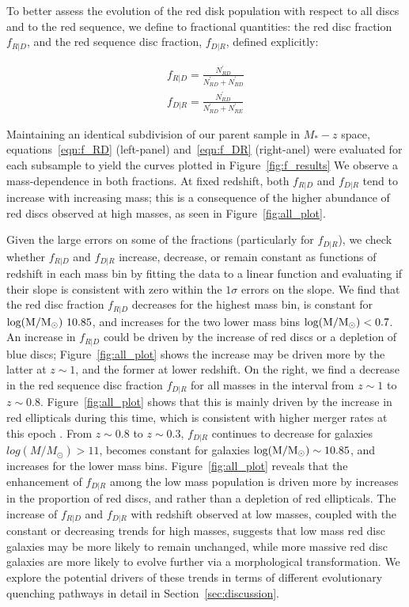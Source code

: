 \documentclass[useAMS,usenatbib]{mn2e}
\begin{document}
To better assess the evolution of the red disk population with respect to all discs and to the red sequence, we define to fractional quantities: the red disc fraction $f_{R|D}$, and the red sequence disc fraction, $f_{D|R}$, defined explicitly:

\begin{align}
f_{R|D} = \frac{N^{'}_{RD}}{N^{'}_{RD}+N^{'}_{BD}} \label{eqn:f_RD}\\
f_{D|R} = \frac{N^{'}_{RD}}{N^{'}_{RD}+N^{'}_{RE}}
\label{eqn:f_DR}
\end{align}


Maintaining an identical subdivision of our parent sample in $M_{*}-z$ space, equations~\ref{eqn:f_RD} (left-panel) and~\ref{eqn:f_DR} (right-anel) were evaluated for each subsample to yield the curves plotted in Figure~\ref{fig:f_results} We observe a mass-dependence in both fractions. At fixed redshift, both $f_{R|D}$ and $f_{D|R}$ tend to increase with increasing mass; this is a consequence of the higher abundance of red discs observed at high masses, as seen in Figure~\ref{fig:all_plot}. 

Given the large errors on some of the fractions (particularly for $f_{D|R}$), we check whether $f_{R|D}$ and $f_{D|R}$ increase, decrease, or remain constant as functions of redshift in each mass bin by fitting the data to a linear function and evaluating if their slope is consistent with zero within the $1 \sigma$ errors on the slope. We find that the red disc fraction $f_{R|D}$ decreases for the highest mass bin, is constant for $\rm log(M/M_{\odot})~10.85$, and increases for the two lower mass bins $\rm log(M/M_{\odot})<0.7$. An increase in $f_{R|D}$ could be driven by the increase of red discs or a depletion of blue discs; Figure~\ref{fig:all_plot} shows the increase may be driven more by the latter at $z\sim1$, and the former at lower redshift. On the right, we find a decrease in the red sequence disc fraction $f_{D|R}$ for all masses in the interval from $z\sim1$ to $z\sim0.8$. Figure~\ref{fig:all_plot} shows that this is mainly driven by the increase in red ellipticals during this time, which is consistent with higher merger rates at this epoch \citep{Molina2016}. From $z\sim0.8$ to $z\sim0.3$, $f_{D|R}$ continues to decrease for galaxies $log(M/M_{\odot})>11$, becomes constant for galaxies $\rm log(M/M_{\odot})\sim10.85$, and increases for the lower mass bins. Figure~\ref{fig:all_plot} reveals that the enhancement of $f_{D|R}$ among the low mass population is driven more by increases in the proportion of red discs, and rather than a depletion of red ellipticals. The increase of $f_{R|D}$ and $f_{D|R}$ with redshift observed at low masses, coupled with the constant or decreasing trends for high masses, suggests that low mass red disc galaxies may be more likely to remain unchanged, while more massive red disc galaxies are more likely to evolve further via a morphological transformation. We explore the potential drivers of these trends in terms of different evolutionary quenching pathways in detail in Section~\ref{sec:discussion}.
\end{document}
